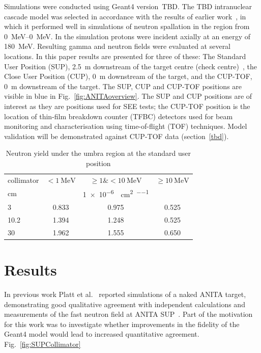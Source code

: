 \documentclass[12pt,journal]{IEEEtran}
\let\MYoriglatexcaption\caption
\renewcommand{\caption}[2][\relax]{\MYoriglatexcaption[#2]{#2}}
\begin{document}
Simulations were conducted using Geant4 version~TBD.
The TBD intranuclear cascade model was selected in accordance with the results of earlier work~\cite{Platt13}, in which it performed well in simulations of neutron spallation in the region from \SIrange{0}{0}{\MeV}.
In the simulation protons were incident axially at an energy of \SI{180}{\MeV}.
Resulting gamma and neutron fields were evaluated at several locations.
In this paper results are presented for three of these: The Standard User Position (SUP), \SI{2.5}{\m} downstream of the target centre (check centre)~\cite{Prokofiev2009}, the Close User Position (CUP), \SI{0}{\m} downstream of the target, and the CUP-TOF, \SI{0}{m} downstream of the target.
The SUP, CUP and CUP-TOF positions are visible in blue in Fig.~\ref{fig:ANITAoverview}.
The SUP and CUP positions are of interest as they are positions used for SEE tests; the CUP-TOF position is the location of thin-film breakdown counter (TFBC) detectors used for beam monitoring and characterisation using time-of-flight (TOF) techniques.
Model validation will be demonstrated against CUP-TOF data (section~\ref{tbd}).



\begin{table}[!tbp]
\caption{Neutron yield under the umbra region at the standard user position}	%
	\label{table:NYieldRadiusEffectAtSUP}
	\centering
	\begin{tabular}{l c c c}
		\toprule
          {collimator}   		&{$< \SI{1}{\MeV}$}	&{$\geq 1 \& <\SI{10}{\MeV}$}	&{$\geq \SI{10}{\MeV}$}\\
          \cmidrule(r){2-4}
          {\si{\centi\metre}}	&						&{\SI{1e-6}{\neutron\per\cm\squared\per\proton}}	&\\
          \midrule
		3 		& 0.833 	& 0.975	& 0.525\\
		10.2 	& 1.394 	& 1.248	& 0.525\\
		30 		& 1.962 	& 1.555	& 0.650\\
           \bottomrule
	\end{tabular}
\end{table}

\section{Results}

In previous work Platt et al.~\cite{Platt13} reported simulations of a naked ANITA target, demonstrating good qualitative agreement with independent calculations and measurements of the fast neutron field at ANITA SUP~\cite{Prokofiev2009}.
Part of the motivation for this work was to investigate whether improvements in the fidelity of the Geant4 model would lead to increased quantitative agreement.
Fig.~\ref{fig:SUPCollimator}
\end{document}
